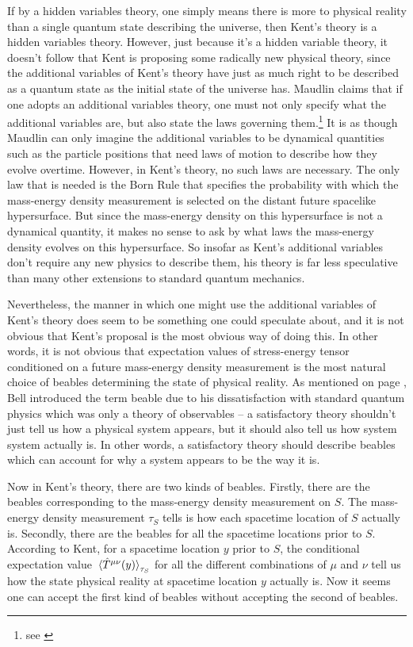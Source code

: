 If by a hidden variables theory, one simply means there is more to physical reality than a single quantum state describing the universe, then Kent's theory is a hidden variables theory. However, just because it's a hidden variable theory, it doesn't follow that Kent is proposing some radically new physical theory, since the additional variables of Kent's theory have just as much right to be described as a quantum state as the initial state of the universe has. Maudlin claims that if one adopts an additional variables theory, one must not only specify what the additional variables are, but also state the laws governing them.\footnote{see \cite[9]{MAUDLINT1995Tmp} } It is as though Maudlin can only imagine the additional variables to be dynamical quantities such as the particle positions that need laws of motion to describe how they evolve overtime. However, in Kent's theory, no such laws are necessary. The only law that is needed is the Born Rule that specifies the probability with which the mass-energy density measurement is selected on the distant future spacelike hypersurface. But since the mass-energy density on this hypersurface is not a dynamical quantity, it makes no sense to ask by what laws the mass-energy density evolves on this hypersurface. So insofar as Kent's additional variables don't require any new physics to describe them, his theory is far less speculative than many other extensions to standard quantum mechanics. 

Nevertheless, the manner in which one might use the additional variables of Kent's theory does seem to be something one could speculate about, and it is not obvious that Kent's proposal is the most obvious way of doing this. In other words, it is not obvious that expectation values of stress-energy tensor conditioned on a future mass-energy density measurement is the most natural choice of beables determining the state of physical reality.  
As mentioned on page \pageref{beabledef}, Bell introduced the term beable due to his dissatisfaction with standard quantum physics which was only a theory of observables -- a satisfactory theory shouldn't just tell us how a physical system appears, but it should also tell us how system system actually is. In other words, a satisfactory theory should describe beables which can account for why a system appears to be the way it is. 

Now in Kent's theory, there are two kinds of beables. Firstly, there are the beables corresponding to the mass-energy density measurement on $S$. The mass-energy density measurement $\tau_S$ tells is how each spacetime location of $S$ actually is. Secondly, there are the beables for all the spacetime locations prior to $S$. According to Kent, for a spacetime location $y$ prior to $S$, the conditional expectation value  $\ev*{\hat{T}^{\mu\nu}(y)}_{\tau_S}$ for all the different combinations of $\mu$ and $\nu$ tell us how the state physical reality at spacetime location $y$ actually is. Now it seems one can accept the first kind of beables without accepting the second of beables.  

